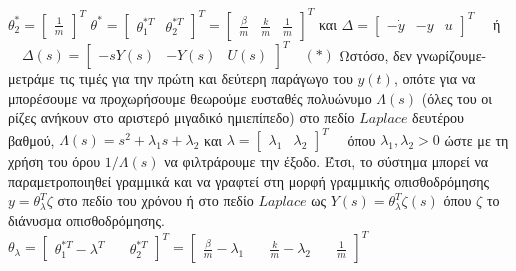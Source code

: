 \documentclass[12pt]{article}
\begin{document}
\qquad
$\theta_{2}^{*}=
\begin{bmatrix}
		\frac{1}{m}
\end{bmatrix}^{T}$
\qquad
$\theta^{*}=
\begin{bmatrix}
		\theta_{1}^{*T} & \theta_{2}^{*T}
\end{bmatrix}^{T}=
\begin{bmatrix}
		\frac{β}{m} & \frac{k}{m} & \frac{1}{m}
\end{bmatrix}^{T}$
\newline 
\newline 
και \quad
$\Delta=
\begin{bmatrix}
		-\dot{y} & -y & u
\end{bmatrix}^{T}
 \quad$ ή $ \quad \Delta(s)=
\begin{bmatrix}
		-sY(s) & -Y(s) & U(s)
\end{bmatrix}^{T} \quad (*)$ 
\newline
\newline
\newline
Ωστόσο, δεν γνωρίζουμε-μετράμε τις τιμές για την πρώτη και δεύτερη παράγωγο του $y(t)$, οπότε για να μπορέσουμε να προχωρήσουμε θεωρούμε ευσταθές πολυώνυμο $\Lambda(s)$  (όλες του οι ρίζες ανήκουν στο αριστερό μιγαδικό ημιεπίπεδο) στο πεδίο $Laplace$ δευτέρου βαθμού, \quad $\Lambda(s)=s^{2}+\lambda_{1}s+\lambda_{2}$ \quad και \quad $\lambda=
\begin{bmatrix}
		\lambda_{1} & \lambda_{2}
\end{bmatrix}^{T} \quad$ όπου $\lambda_{1},\lambda_{2}>0$
ώστε με τη χρήση του όρου $1/\Lambda(s)$ να φιλτράρουμε την έξοδο.
\newline
\newline
Έτσι, το σύστημα μπορεί να παραμετροποιηθεί γραμμικά και να γραφτεί στη μορφή γραμμικής οπισθοδρόμησης \quad  $y=\theta^{T}_{\lambda}\zeta$ \quad  στο πεδίο του χρόνου ή στο πεδίο $Laplace$ ως \quad $Y(s)=\theta^{T}_{\lambda}\zeta(s)$ \quad όπου $\zeta$ το διάνυσμα οπισθοδρόμησης.
\newline
\newline 
 $\theta_{\lambda}=\begin{bmatrix}
		\theta_{1}^{*T}-\lambda^{T} \quad& \theta_{2}^{*T}
\end{bmatrix}^{T}=
\begin{bmatrix}
		\frac{β}{m}-\lambda_{1} \quad &  \frac{k}{m}-\lambda_{2} \quad &  \frac{1}{m}
\end{bmatrix}^{T}
$
\newline
\newline
\end{document}
